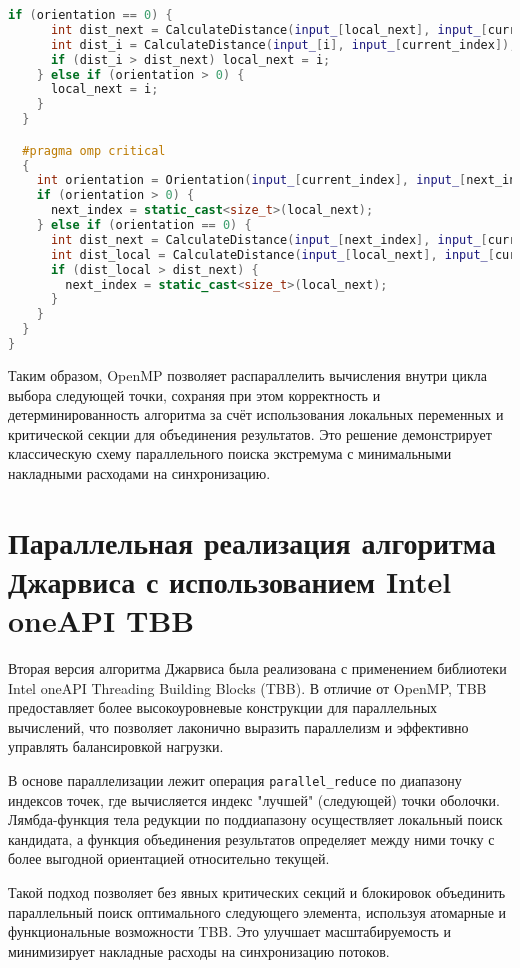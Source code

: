 \documentclass[a4paper,12pt]{article}
\begin{document}
\begin{itemize}
\begin{lstlisting}[language=C++, caption={Параллельный выбор следующей точки оболочки с использованием OpenMP}]
    if (orientation == 0) {
      int dist_next = CalculateDistance(input_[local_next], input_[current_index]);
      int dist_i = CalculateDistance(input_[i], input_[current_index]);
      if (dist_i > dist_next) local_next = i;
    } else if (orientation > 0) {
      local_next = i;
    }
  }

  #pragma omp critical
  {
    int orientation = Orientation(input_[current_index], input_[next_index], input_[local_next]);
    if (orientation > 0) {
      next_index = static_cast<size_t>(local_next);
    } else if (orientation == 0) {
      int dist_next = CalculateDistance(input_[next_index], input_[current_index]);
      int dist_local = CalculateDistance(input_[local_next], input_[current_index]);
      if (dist_local > dist_next) {
        next_index = static_cast<size_t>(local_next);
      }
    }
  }
}
\end{lstlisting}

Таким образом, OpenMP позволяет распараллелить вычисления внутри цикла выбора следующей точки, сохраняя при этом корректность и детерминированность алгоритма за счёт использования локальных переменных и критической секции для объединения результатов. Это решение демонстрирует классическую схему параллельного поиска экстремума с минимальными накладными расходами на синхронизацию.
\newpage
\section{Параллельная реализация алгоритма Джарвиса с использованием Intel oneAPI TBB}

Вторая версия алгоритма Джарвиса была реализована с применением библиотеки Intel oneAPI Threading Building Blocks (TBB). В отличие от OpenMP, TBB предоставляет более высокоуровневые конструкции для параллельных вычислений, что позволяет лаконично выразить параллелизм и эффективно управлять балансировкой нагрузки.

В основе параллелизации лежит операция \texttt{parallel\_reduce} по диапазону индексов точек, где вычисляется индекс "лучшей" (следующей) точки оболочки. Лямбда-функция тела редукции по поддиапазону осуществляет локальный поиск кандидата, а функция объединения результатов определяет между ними точку с более выгодной ориентацией относительно текущей.

Такой подход позволяет без явных критических секций и блокировок объединить параллельный поиск оптимального следующего элемента, используя атомарные и функциональные возможности TBB. Это улучшает масштабируемость и минимизирует накладные расходы на синхронизацию потоков.


\end{itemize}
\end{document}
